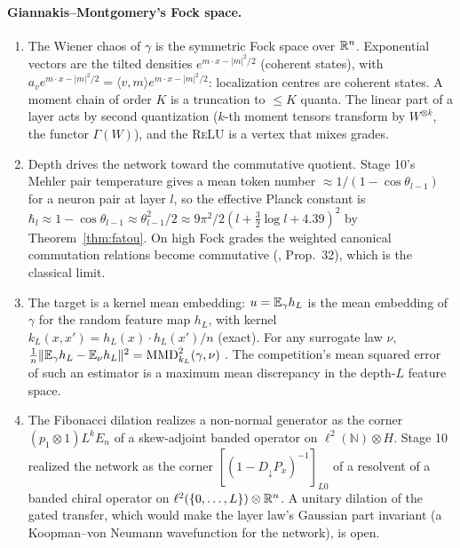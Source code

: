 \paragraph{Giannakis--Montgomery's Fock space.}
\begin{enumerate}[leftmargin=*]
\item The Wiener chaos of $\gamma$ is the symmetric Fock space over $\mathbb R^n$. Exponential vectors are the tilted densities $e^{m\cdot x-|m|^2/2}$
(coherent states), with $a_ve^{m\cdot x-|m|^2/2}=\langle v,m\rangle e^{m\cdot x-|m|^2/2}$: localization centres are coherent states. A moment
chain of order $K$ is a truncation to $\le K$ quanta. The linear part of a layer acts by second quantization ($k$-th moment tensors
transform by $W^{\otimes k}$, the functor $\Gamma(W)$), and the \textsc{ReLU} is a vertex that mixes grades.
\item Depth drives the network toward the commutative quotient. Stage 10's Mehler pair temperature gives a mean token number
$\approx1/(1-\cos\theta_{l-1})$ for a neuron pair at layer $l$, so the effective Planck constant is $\hbar_l\approx1-\cos\theta_{l-1}\approx\theta_{l-1}^2/2
\approx9\pi^2/2(l+\tfrac32\log l+4.39)^2$ by Theorem~\ref{thm:fatou}. On high Fock grades the weighted canonical commutation relations become
commutative (\cite{GM}, Prop.~32), which is the classical limit.
\item The target is a kernel mean embedding: $u=\mathbb E_\gamma h_L$ is the mean embedding of $\gamma$ for the random feature map $h_L$, with kernel
$k_L(x,x')=h_L(x)\cdot h_L(x')/n$ (exact). For any surrogate law $\nu$, $\frac1n\|\mathbb E_\gamma h_L-\mathbb E_\nu h_L\|^2=\mathrm{MMD}^2_{k_L}(\gamma,\nu)$
\cite{MMD}. The competition's mean squared error of such an estimator is a maximum mean discrepancy in the depth-$L$ feature space.
\item The Fibonacci dilation realizes a non-normal generator as the corner $(p_1\otimes1)L^kE_n$ of a skew-adjoint banded operator on
$\ell^2(\mathbb N)\otimes H$. Stage 10 realized the network as the corner $[(1-D_\downarrow P_x)^{-1}]_{L0}$ of a resolvent of a banded chiral
operator on $\ell^2(\{0,\dots,L\})\otimes\mathbb R^n$. A unitary dilation of the gated transfer, which would make the layer law's Gaussian part
invariant (a Koopman--von Neumann wavefunction for the network), is open.
\end{enumerate}
